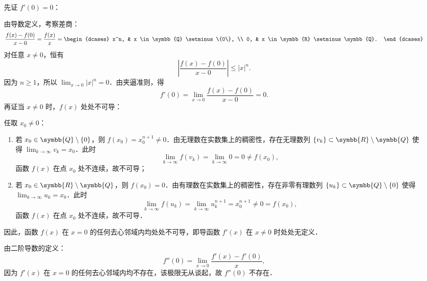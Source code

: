 \begin{myproof}
    先证 $f'(0) = 0$：

    由导数定义，考察差商：
    \begin{equation}
        \frac{f(x) - f(0)}{x - 0} = \frac{f(x)}{x} = \begin{dcases} x^n, & x \in \symbb{Q} \setminus \{0\}, \\ 0, & x \in \symbb{R} \setminus \symbb{Q}. \end{dcases}
    \end{equation}
    对任意 $x \neq 0$，恒有
    \begin{equation}
        \left| \frac{f(x) - f(0)}{x - 0} \right| \leqslant |x|^n.
    \end{equation}
    因为 $n \geqslant 1$，所以 $\lim_{x\to 0} |x|^n = 0$．由夹逼准则，得
    \begin{equation}
        f'(0) = \lim_{x\to 0} \frac{f(x) - f(0)}{x - 0} = 0.
    \end{equation}
    再证当 $x \neq 0$ 时，$f(x)$ 处处不可导：

    任取 $x_0 \neq 0$：
    \begin{enumerate}
        \item 若 $x_0 \in \symbb{Q} \setminus \{0\}$，则 $f(x_0) = x_0^{n+1} \neq 0$．由无理数在实数集上的稠密性，存在无理数列 $\{v_k\} \subset \symbb{R} \setminus \symbb{Q}$ 使得 $\lim_{k\to\infty} v_k = x_0$．此时
              \begin{equation}
                  \lim_{k\to\infty} f(v_k) = \lim_{k\to\infty} 0 = 0 \neq f(x_0),
              \end{equation}
              函数 $f(x)$ 在点 $x_0$ 处不连续，故不可导；
        \item 若 $x_0 \in \symbb{R} \setminus \symbb{Q}$，则 $f(x_0) = 0$．由有理数在实数集上的稠密性，存在非零有理数列 $\{u_k\} \subset \symbb{Q} \setminus \{0\}$ 使得 $\lim_{k\to\infty} u_k = x_0$．此时
              \begin{equation}
                  \lim_{k\to\infty} f(u_k) = \lim_{k\to\infty} u_k^{n+1} = x_0^{n+1} \neq 0 = f(x_0),
              \end{equation}
              函数 $f(x)$ 在点 $x_0$ 处不连续，故不可导．
    \end{enumerate}
    因此，函数 $f(x)$ 在 $x = 0$ 的任何去心邻域内均处处不可导，即导函数 $f'(x)$ 在 $x \neq 0$ 时处处无定义．

    由二阶导数的定义：
    \begin{equation}
        f''(0) = \lim_{x\to 0} \frac{f'(x) - f'(0)}{x},
    \end{equation}
    因为 $f'(x)$ 在 $x = 0$ 的任何去心邻域内均不存在，该极限无从谈起，故 $f''(0)$ 不存在．
\end{myproof}

